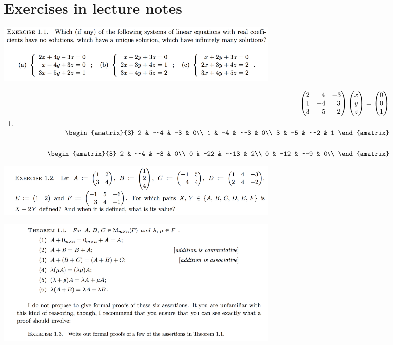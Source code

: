 \documentclass[12pt]{article}
\begin{document}
\section{Exercises in lecture notes}

\begin{mdframed}
\includegraphics[width=400pt]{img/oxford-prelims-M1-linear-algebra-1-1.png}
\end{mdframed}
\begin{enumerate}[label=(\alph*)]
\item
  \begin{align*}
    \matMMMxNNN{2}{~~4}{-3}
               {1}{-4}{~~3}
               {3}{-5}{~~2} \vecMMM{x}{y}{z} = \vecMMM{0}{0}{1}\\
    ~\\
    \begin{amatrix}{3}
      2 & ~~4 &   -3  & 0\\
      1 &  -4 &  ~~3  & 0\\
      3 &  -5 &  ~~2  & 1
    \end{amatrix}&
                        ~\\
                        ~\\
    \begin{amatrix}{3}
      2 & ~~4 &   -3  & 0\\
      0 &  -22 &  ~~13  & 2\\
      0 &  -12 &  ~~9  & 0\\
    \end{amatrix}&
  \end{align*}
\end{enumerate}

\begin{mdframed}
\includegraphics[width=400pt]{img/oxford-prelims-M1-linear-algebra-1-2.png}
\end{mdframed}

\begin{mdframed}
\includegraphics[width=400pt]{img/oxford-prelims-M1-linear-algebra-1-3.png}
\end{mdframed}
\end{document}
